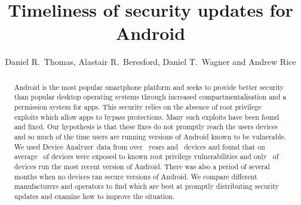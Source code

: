 \documentclass[conference,a4paper,twoside]{IEEEtran}
\author{Daniel R.\ Thomas, Alastair R.\ Beresford, Daniel T.\ Wagner and Andrew Rice}
\newcommand{\da}{Device Analyzer}
\begin{document}
\title{Timeliness of security updates for Android}


\author{
}




\maketitle


\begin{abstract}
Android is the most popular smartphone platform and seeks to provide better security than popular desktop operating systems through increased compartmentalisation and a permission system for apps.
This security relies on the absence of root privilege exploits which allow apps to bypass protections.
Many such exploits have been found and fixed.
Our hypothesis is that these fixes do not promptly reach the users devices and so much of the time users are running versions of Android known to be vulnerable.
We used \da\ data from over \daOSYearsOfData\ years and \daNumOSDevices\ devices and found that on average \daMeanInsecurityPerc\ of devices were exposed to known root privilege vulnerabilities and only \daUpdatednessPerc\ of devices run the most recent version of Android.
There was also a period of several months when no devices ran secure versions of Android.
We compare different manufacturers and operators to find which are best at promptly distributing security updates and examine how to improve the situation. %
\end{abstract}
\end{document}
